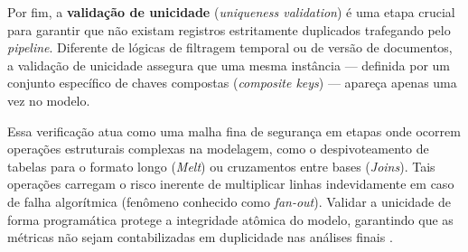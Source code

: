 Por fim, a \textbf{validação de unicidade} (\textit{uniqueness validation}) é uma etapa crucial para garantir que não existam registros estritamente duplicados trafegando pelo \textit{pipeline}. Diferente de lógicas de filtragem temporal ou de versão de documentos, a validação de unicidade assegura que uma mesma instância — definida por um conjunto específico de chaves compostas (\textit{composite keys}) — apareça apenas uma vez no modelo. 

Essa verificação atua como uma malha fina de segurança em etapas onde ocorrem operações estruturais complexas na modelagem, como o despivoteamento de tabelas para o formato longo (\textit{Melt}) ou cruzamentos entre bases (\textit{Joins}). Tais operações carregam o risco inerente de multiplicar linhas indevidamente em caso de falha algorítmica (fenômeno conhecido como \textit{fan-out}). Validar a unicidade de forma programática protege a integridade atômica do modelo, garantindo que as métricas não sejam contabilizadas em duplicidade nas análises finais \cite{reis22}.